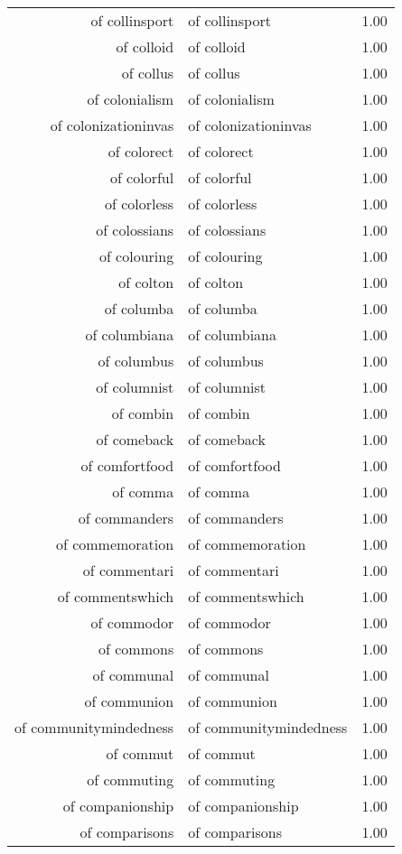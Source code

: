 \begin{table}[ht]
\begin{tabular}{rlr}
  of collinsport & of collinsport & 1.00 \\ 
  of colloid & of colloid & 1.00 \\ 
  of collus & of collus & 1.00 \\ 
  of colonialism & of colonialism & 1.00 \\ 
  of colonizationinvas & of colonizationinvas & 1.00 \\ 
  of colorect & of colorect & 1.00 \\ 
  of colorful & of colorful & 1.00 \\ 
  of colorless & of colorless & 1.00 \\ 
  of colossians & of colossians & 1.00 \\ 
  of colouring & of colouring & 1.00 \\ 
  of colton & of colton & 1.00 \\ 
  of columba & of columba & 1.00 \\ 
  of columbiana & of columbiana & 1.00 \\ 
  of columbus & of columbus & 1.00 \\ 
  of columnist & of columnist & 1.00 \\ 
  of combin & of combin & 1.00 \\ 
  of comeback & of comeback & 1.00 \\ 
  of comfortfood & of comfortfood & 1.00 \\ 
  of comma & of comma & 1.00 \\ 
  of commanders & of commanders & 1.00 \\ 
  of commemoration & of commemoration & 1.00 \\ 
  of commentari & of commentari & 1.00 \\ 
  of commentswhich & of commentswhich & 1.00 \\ 
  of commodor & of commodor & 1.00 \\ 
  of commons & of commons & 1.00 \\ 
  of communal & of communal & 1.00 \\ 
  of communion & of communion & 1.00 \\ 
  of communitymindedness & of communitymindedness & 1.00 \\ 
  of commut & of commut & 1.00 \\ 
  of commuting & of commuting & 1.00 \\ 
  of companionship & of companionship & 1.00 \\ 
  of comparisons & of comparisons & 1.00 \\ 

\end{tabular}
\end{table}
